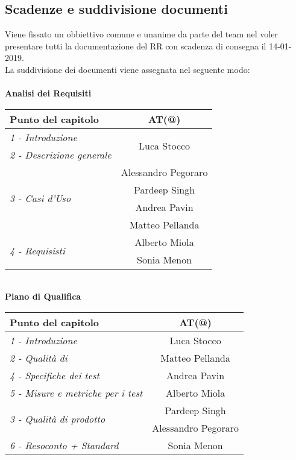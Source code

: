 \subsection{Scadenze e suddivisione documenti}
	Viene fissato un obbiettivo comune e unanime da parte del team nel voler presentare tutti la documentazione del RR con scadenza di consegna il 14-01-2019.\\
	La suddivisione dei documenti viene assegnata nel seguente modo:\\\\
	\textbf{Analisi dei Requisiti}\\[0.25cm]
		\renewcommand{\arraystretch}{1.5}
		\begin{tabular}{  l | c }
			\hline
			\textbf{Punto del capitolo}&\textbf{AT(@)}\\
			\hline
			\emph{1 - Introduzione} & \multirow{2}{*}{Luca Stocco}\\ \emph{2 - Descrizione generale}  \\
			\hline
			\multirow{4}{*}{\emph{3 - Casi d'Uso}} & Alessandro Pegoraro\\&Pardeep Singh\\&Andrea Pavin\\&Matteo Pellanda\\
			\hline
			\multirow{2}{*}{\emph{4 - Requisisti}} &  Alberto Miola\\&Sonia Menon\\
			\hline
		\end{tabular}
	\\[0.7cm]
	\textbf{Piano di Qualifica}\\[0.25cm]
	\begin{tabular}{  l | c }
		\hline
		\textbf{Punto del capitolo}&\textbf{AT(@)}\\
		\hline
		\emph{1 - Introduzione} & Luca Stocco  \\ \emph{2 - Qualità di \markg{processo}} & Matteo Pellanda\\
		\hline
		\emph{4 - Specifiche dei test} & Andrea Pavin  \\ \emph{5 - Misure e metriche per i test} & Alberto Miola\\
		\hline
		\multirow{2}{*}{\emph{3 - Qualità di prodotto}} & Pardeep Singh\\&Alessandro Pegoraro\\
		\hline
	   	\emph{6 - Resoconto + Standard \markg{ISO}} & Sonia Menon\\
		\hline
	\end{tabular}
	\\[1cm]
